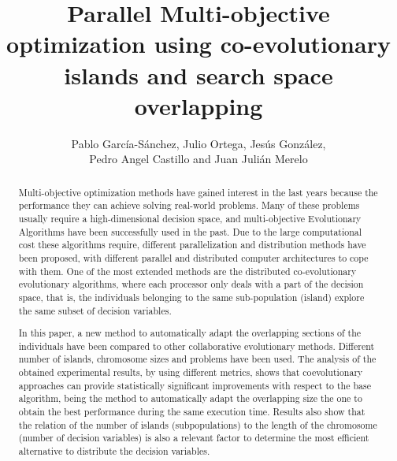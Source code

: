 \documentclass[Afour,sageh,times]{sagej}
\begin{document}

\title{Parallel Multi-objective optimization using co-evolutionary islands and search space overlapping}

\author{Pablo Garc\'ia-S\'anchez, Julio Ortega, Jes\'us Gonz\'alez, \\Pedro Angel Castillo and Juan Juli\'an Merelo}




\begin{abstract}
Multi-objective optimization methods have gained interest in the last years because the performance they can achieve solving real-world problems. Many of these problems usually require a high-dimensional decision space, and multi-objective Evolutionary Algorithms have been successfully used in the past. Due to the large computational cost these algorithms require, different parallelization and distribution methods have been proposed, with different parallel and distributed computer architectures to cope with them. One of the most extended methods are the distributed co-evolutionary evolutionary algorithms, where each processor only deals with a part of the decision space, that is, the individuals belonging to the same sub-population (island) explore the same subset of decision variables.  

In this paper, a new method to automatically adapt the overlapping sections of the individuals have been compared to other collaborative evolutionary methods.
Different number of islands, chromosome sizes and problems have been used. The analysis of the obtained experimental results, by using different 
metrics, shows that coevolutionary approaches can provide statistically significant improvements with respect to the base algorithm, being the method to automatically adapt the overlapping size the one to obtain the best performance during the same execution time. Results also show that the relation of the number of 
islands (subpopulations) to the length of the chromosome (number of decision variables) is also a relevant factor to determine the most efficient alternative to distribute the decision variables.
\end{abstract}
\end{document}
